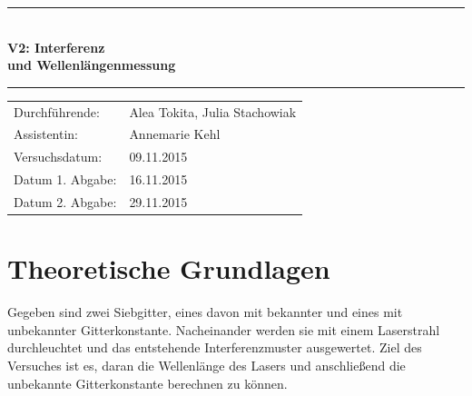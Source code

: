 \documentclass[12pt,a4paper,titlepage,headinclude,bibtotoc]{scrartcl}
\begin{document}
\begin{titlepage}
\centering

\vspace*{3cm}

\rule{\textwidth}{1pt}\\[0.5cm]
{\huge \bfseries
  V2: Interferenz\\[1.5ex]
  und Wellenlängenmessung}\\[0.5cm]
\rule{\textwidth}{1pt}

\vspace*{3cm}


\begin{Large}
\begin{tabular}{ll}
Durchführende: &  Alea Tokita, Julia Stachowiak\\
Assistentin: & Annemarie Kehl\\
 Versuchsdatum: & 09.11.2015\\
 Datum 1. Abgabe: & 16.11.2015\\
 Datum 2. Abgabe: & 29.11.2015\\
\end{tabular}
\end{Large}

\vspace*{2.5cm}

\begin{Large}
\end{Large}

\end{titlepage}

\tableofcontents

\newpage

\section{Theoretische Grundlagen}
Gegeben sind zwei Siebgitter, eines davon mit bekannter und eines mit unbekannter Gitterkonstante. Nacheinander werden sie mit einem Laserstrahl durchleuchtet und das entstehende Interferenzmuster ausgewertet. Ziel des Versuches ist es, daran die Wellenlänge des Lasers und anschließend die unbekannte Gitterkonstante berechnen zu können.
\end{document}
